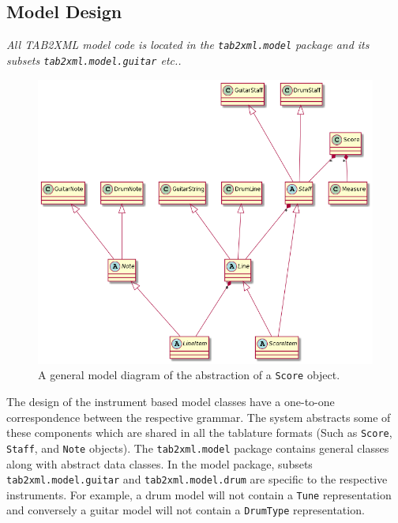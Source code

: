 \documentclass[11pt]{article}
\begin{document}
\subsection{Model Design}
\label{sec:org3fd5d01}
\emph{All TAB2XML model code is located in the \texttt{tab2xml.model} package and its subsets \texttt{tab2xml.model.guitar} etc..}
\begin{figure}[htbp]
\centering
\includegraphics[width=.9\linewidth]{./Diagrams/backend-model-abstraction.png}
\caption{A general model diagram of the abstraction of a \texttt{Score} object.}
\end{figure}

The design of the instrument based model classes have a one-to-one correspondence between the respective grammar. The system abstracts some of these components which are shared in all the tablature formats (Such as \texttt{Score}, \texttt{Staff}, and \texttt{Note} objects). The \texttt{tab2xml.model} package contains general classes along with abstract data classes. In the model package, subsets \texttt{tab2xml.model.guitar} and \texttt{tab2xml.model.drum} are specific to the respective instruments. For example, a drum model will not contain a \texttt{Tune} representation and conversely a guitar model will not contain a \texttt{DrumType} representation.
\end{document}

